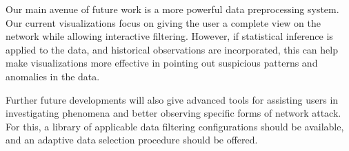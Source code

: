Our main avenue of future work is a more powerful data preprocessing system. Our current visualizations focus on giving the user a complete view on the network while allowing interactive filtering. However, if statistical inference is applied to the data, and historical observations are incorporated, this can help make visualizations more effective in pointing out suspicious patterns and anomalies in the data.

Further future developments will also give advanced tools for assisting users in investigating phenomena and better observing specific forms of network attack. For this, a library of applicable data filtering configurations should be available, and an adaptive data selection procedure should be offered.